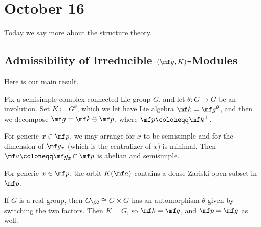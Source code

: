 \documentclass[../notes.tex]{subfiles}
\begin{document}
\section{October 16}
Today we say more about the structure theory.

\subsection{Admissibility of Irreducible \texorpdfstring{$(\mf g,K)$}{ (g, K)}-Modules}
Here is our main result.
\begin{proposition} \label{prop:generic-split-element}
	Fix a semisimple complex connected Lie group $G$, and let $\theta\colon G\to G$ be an involution. Set $K\coloneqq G^\theta$, which we let have Lie algebra $\mf k=\mf g^\theta$, and then we decompose $\mf g=\mf k\oplus\mf p$, where $\mf p\coloneqq\mf k^\perp$.
	\begin{listalph}
		\item For generic $x\in\mf p$, we may arrange for $x$ to be semisimple and for the dimension of $\mf g_x$ (which is the centralizer of $x$) is minimal. Then $\mf a\coloneqq\mf g_x\cap\mf p$ is abelian and semisimple.
		\item For generic $x\in\mf p$, the orbit $K(\mf a)$ contains a dense Zariski open subset in $\mf p$.
	\end{listalph}
\end{proposition}
\begin{example}
	If $G$ is a real group, then $G_\CC\cong G\times G$ has an automorphism $\theta$ given by switching the two factors. Then $K=G$, so $\mf k=\mf g$, and $\mf p=\mf g$ as well.
\end{example}
\end{document}
